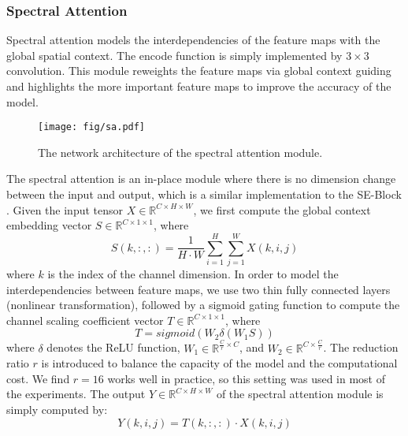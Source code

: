 \documentclass[journal]{IEEEtran}
\begin{document}
\subsubsection{\textbf{Spectral Attention}}
\label{sec:sa}
Spectral attention models the interdependencies of the feature maps with the global spatial context.
The encode function is simply implemented by $3\times 3$ convolution.
This module reweights the feature maps via global context guiding and highlights the more important feature maps to improve the accuracy of the model.
\begin{figure}[hbt]
  \centering
  \texttt{[image: fig/sa.pdf]}
  \caption{The network architecture of the spectral attention module.}
  \label{fig:sa}
\end{figure}

The spectral attention is an in-place module where there is no dimension change between the input and output, which is a similar implementation to the SE-Block \cite{hu2018squeeze}.
Given the input tensor $X \in \mathbb{R}^{C\times H \times W}$, we first compute the global context embedding vector $S \in \mathbb{R}^{C\times 1 \times 1}$, where
\begin{equation}
  S(k,:, :) =  \frac{1}{H \cdot W} \sum_{i=1}^{H}\sum_{j=1}^{W}X(k, i, j)
\end{equation}
where $k$ is the index of the channel dimension.
In order to model the interdependencies between feature maps, we use two thin fully connected layers (nonlinear transformation), followed by a sigmoid gating function to compute the channel scaling coefficient vector $T \in \mathbb{R}^{C\times 1 \times 1}$, where
\begin{equation}
  T = sigmoid(W_2\delta(W_1S))
\end{equation}
where $\delta$ denotes the ReLU function, $W_1 \in \mathbb{R}^{\frac{C}{r} \times C}$, and $W_2 \in \mathbb{R}^{C \times \frac{C}{r}}$.
The reduction ratio $r$ is introduced to balance the capacity of the model and the computational cost.
We find $r = 16$ works well in practice, so this setting was used in most of the experiments.
The output $Y \in \mathbb{R}^{C\times H \times W}$ of the spectral attention module is simply computed by:
\begin{equation}
  Y(k, i, j) = T(k,:, :) \cdot X(k, i, j)
\end{equation}
\end{document}
